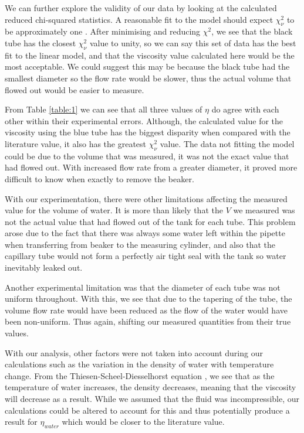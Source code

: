 \documentclass[twocolumn]{revtex4}
\begin{document}
We can further explore the validity of our data by looking at the calculated reduced chi-squared statistics. A reasonable fit to the model should expect $\chi^2_{\nu}$ to be approximately one \cite{hughesandhayes}. After minimising and reducing $\chi^2$, we see that the black tube has the closest $\chi^2_{\nu}$ value to unity, so we can say this set of data has the best fit to the linear model, and that the viscosity value calculated here would be the most acceptable. We could suggest this may be because the black tube had the smallest diameter so the flow rate would be slower, thus the actual volume that flowed out would be easier to measure.

From Table \ref{table:1} we can see that all three values of $\eta$ do agree with each other within their experimental errors. Although, the calculated value for the viscosity using the blue tube has the biggest disparity when compared with the literature value, it also has the greatest $\chi^2_{\nu}$ value. The data not fitting the model could be due to the volume that was measured, it was not the exact value that had flowed out. With increased flow rate from a greater diameter, it proved more difficult to know when exactly to remove the beaker. 

With our experimentation, there were other limitations affecting the measured value for the volume of water. It is more than likely that the $V$ we measured was not the actual value that had flowed out of the tank for each tube. This problem arose due to the fact that there was always some water left within the pipette when transferring from beaker to the measuring cylinder, and also that the capillary tube would not form a perfectly air tight seal with the tank so water inevitably leaked out.

Another experimental limitation was that the diameter of each tube was not uniform throughout. With this, we see that due to the tapering of the tube, the volume flow rate would have been reduced as the flow of the water would have been non-uniform. Thus again, shifting our measured quantities from their true values.

With our analysis, other factors were not taken into account during our calculations such as the variation in the density of water with temperature change. From the Thiesen-Scheel-Diesselhorst equation \cite{dentemp}, we see that as the temperature of water increases, the density decreases, meaning that the viscosity will decrease as a result. While we assumed that the fluid was incompressible, our calculations could be altered to account for this and thus potentially produce a result for $\eta_{water}$ which would be closer to the literature value.
\end{document}
